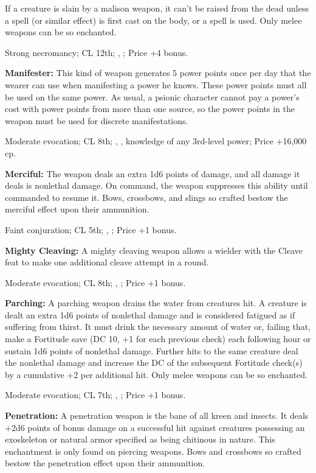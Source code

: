 If a creature is slain by a malison weapon, it can’t be raised from the dead unless a  spell (or similar effect) is first cast on the body, or a  spell is used. Only melee weapons can be so enchanted.

Strong necromancy; CL 12th; , ; Price +4 bonus.

\textbf{Manifester:} This kind of weapon generates 5 power points once per day that the wearer can use when manifesting a power he knows. These power points must all be used on the same power. As usual, a psionic character cannot pay a power's cost with power points from more than one source, so the power points in the weapon must be used for discrete manifestations.

Moderate evocation; CL 8th; , , knowledge of any 3rd-level power; Price +16,000 cp.

\textbf{Merciful:} The weapon deals an extra 1d6 points of damage, and all damage it deals is nonlethal damage. On command, the weapon suppresses this ability until commanded to resume it. Bows, crossbows, and slings so crafted bestow the merciful effect upon their ammunition.

Faint conjuration; CL 5th; , ; Price +1 bonus.

\textbf{Mighty Cleaving:} A mighty cleaving weapon allows a wielder with the Cleave feat to make one additional cleave attempt in a round.

Moderate evocation; CL 8th; , ; Price +1 bonus.

\textbf{Parching:} A parching weapon drains the water from creatures hit. A creature is dealt an extra 1d6 points of nonlethal damage and is considered fatigued as if suffering from thirst. It must drink the necessary amount of water or, failing that, make a Fortitude save (DC 10, +1 for each previous check) each following hour or sustain 1d6 points of nonlethal damage. Further hits to the same creature deal the nonlethal damage and increase the DC of the subsequent Fortitude check(s) by a cumulative +2 per additional hit. Only melee weapons can be so enchanted.

Moderate evocation; CL 7th; , ; Price +1 bonus.

\textbf{Penetration:} A penetration weapon is the bane of all kreen and insects. It deals +2d6 points of bonus damage on a successful hit against creatures possessing an exoskeleton or natural armor specified as being chitinous in nature. This enchantment is only found on piercing weapons. Bows and crossbows so crafted bestow the penetration effect upon their ammunition.

